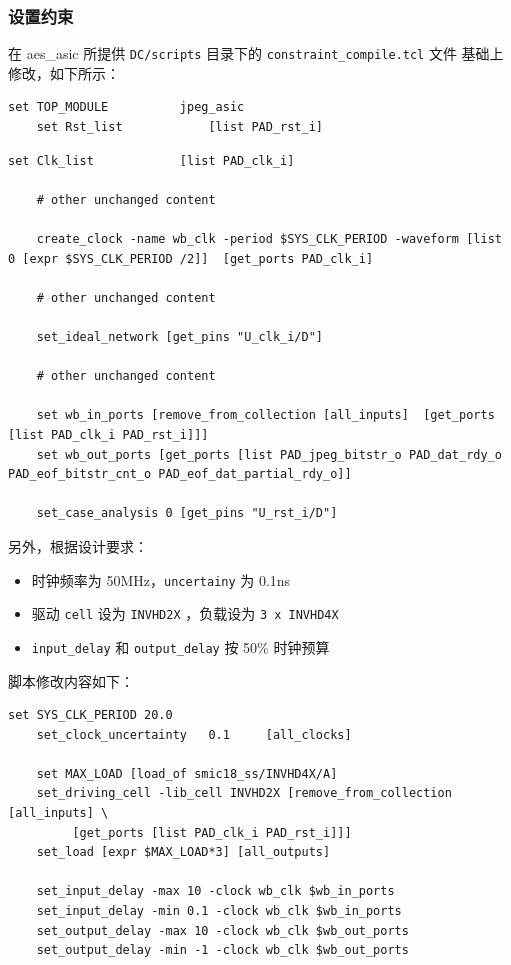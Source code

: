 \documentclass[12pt,hyperref,a4paper,UTF8]{ctexart}
\begin{document}
\subsubsection{设置约束}
在 aes\_asic 所提供 \texttt{DC/scripts} 目录下的 \texttt{constraint\_compile.tcl} 文件
基础上修改，如下所示：

\begin{lstlisting}[style=tclstyle,name=constraint_compile.tcl]
    set TOP_MODULE          jpeg_asic
    set Rst_list            [list PAD_rst_i]
\end{lstlisting}

\begin{lstlisting}[style=tclstyle,name=constraint_compile.tcl]
    set Clk_list            [list PAD_clk_i]
    
    # other unchanged content
    
    create_clock -name wb_clk -period $SYS_CLK_PERIOD -waveform [list 0 [expr $SYS_CLK_PERIOD /2]]  [get_ports PAD_clk_i]
    
    # other unchanged content
    
    set_ideal_network [get_pins "U_clk_i/D"]
    
    # other unchanged content
    
    set wb_in_ports [remove_from_collection [all_inputs]  [get_ports [list PAD_clk_i PAD_rst_i]]]
    set wb_out_ports [get_ports [list PAD_jpeg_bitstr_o PAD_dat_rdy_o PAD_eof_bitstr_cnt_o PAD_eof_dat_partial_rdy_o]]

    set_case_analysis 0 [get_pins "U_rst_i/D"]
\end{lstlisting}

另外，根据设计要求：
\begin{itemize}
    \item 时钟频率为 50\unit{\MHz}，\texttt{uncertainy} 为 0.1\unit{\ns}
    \item 驱动 \texttt{cell} 设为 \texttt{INVHD2X} ，负载设为 \texttt{3 x INVHD4X}
    \item \texttt{input\_delay} 和 \texttt{output\_delay} 按 50\% 时钟预算
\end{itemize}
脚本修改内容如下：
\begin{lstlisting}[style=tclstyle,name=constraint_compile_1.tcl]
    set SYS_CLK_PERIOD 20.0
    set_clock_uncertainty   0.1     [all_clocks]
    
    set MAX_LOAD [load_of smic18_ss/INVHD4X/A]
    set_driving_cell -lib_cell INVHD2X [remove_from_collection [all_inputs] \
         [get_ports [list PAD_clk_i PAD_rst_i]]]
    set_load [expr $MAX_LOAD*3] [all_outputs]

    set_input_delay -max 10 -clock wb_clk $wb_in_ports
    set_input_delay -min 0.1 -clock wb_clk $wb_in_ports
    set_output_delay -max 10 -clock wb_clk $wb_out_ports
    set_output_delay -min -1 -clock wb_clk $wb_out_ports
\end{lstlisting}
\end{document}
